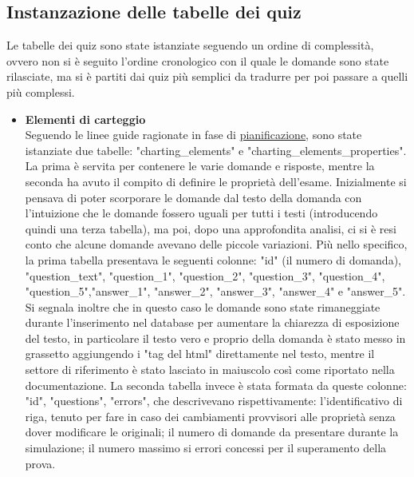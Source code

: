 \subsection{Instanzazione delle tabelle dei quiz}
Le tabelle dei quiz sono state istanziate seguendo un ordine di complessità, ovvero non si è seguito l'ordine cronologico con il quale le domande sono state rilasciate, ma si è partiti dai quiz più semplici da tradurre per poi passare a quelli più complessi.\\
\begin{itemize}
	\item \textbf{Elementi di carteggio}\\
	Seguendo le linee guide ragionate in fase di  \hyperref[cap:Introduzione]{pianificazione}, sono state istanziate due tabelle: "charting\_elements" e  "charting\_elements\_properties". La prima è servita per contenere le varie domande e risposte, mentre la seconda ha avuto il compito di definire le proprietà dell'esame. Inizialmente si pensava di poter scorporare le domande dal testo della domanda con l'intuizione che le domande fossero uguali per tutti i testi (introducendo quindi una terza tabella), ma poi, dopo una approfondita analisi, ci si è resi conto che alcune domande avevano delle piccole variazioni. 
	Più nello specifico, la prima tabella presentava le seguenti colonne: "id" (il numero di domanda), "question\_text", "question\_1", "question\_2", "question\_3", "question\_4", "question\_5","answer\_1", "answer\_2", "answer\_3", "answer\_4" e "answer\_5". Si segnala inoltre che in questo caso le domande sono state rimaneggiate durante l'inserimento nel database per aumentare la chiarezza di esposizione del testo, in particolare il testo vero e proprio della domanda è stato messo in grassetto aggiungendo i "tag del html" direttamente nel testo, mentre il settore di riferimento è stato lasciato in maiuscolo così come riportato nella documentazione. La seconda tabella invece è stata formata da queste colonne: "id", "questions", "errors", che descrivevano rispettivamente: l'identificativo di riga, tenuto per fare in caso dei cambiamenti provvisori alle proprietà senza dover modificare le originali; il numero di domande da presentare durante la simulazione; il numero massimo si errori concessi per il superamento della prova. 
	

\end{itemize}

